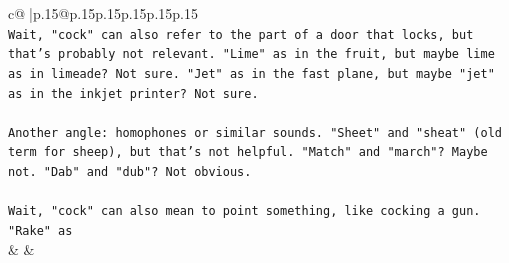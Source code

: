 \documentclass{article}
\begin{document}
{\begin{supertabular}{c@{$\;$}|p{.15\linewidth}@{}p{.15\linewidth}p{.15\linewidth}p{.15\linewidth}p{.15\linewidth}p{.15\linewidth}}
{{{\\ 
\texttt{Wait, "cock" can also refer to the part of a door that locks, but that's probably not relevant. "Lime" as in the fruit, but maybe lime as in limeade? Not sure. "Jet" as in the fast plane, but maybe "jet" as in the inkjet printer? Not sure.} \\
\\ 
\texttt{Another angle: homophones or similar sounds. "Sheet" and "sheat" (old term for sheep), but that's not helpful. "Match" and "march"? Maybe not. "Dab" and "dub"? Not obvious.} \\
\\ 
\texttt{Wait, "cock" can also mean to point something, like cocking a gun. "Rake" as} \\
            }
        }
    }
    & & \\ \\


\end{supertabular}}
\end{document}
